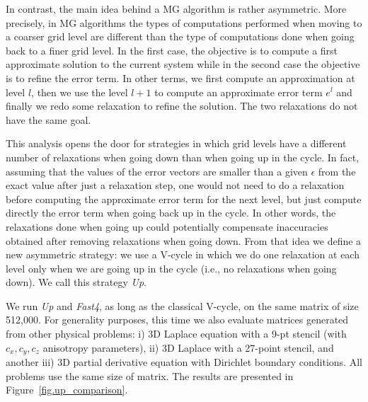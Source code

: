 In contrast, the main idea behind a MG algorithm is rather asymmetric. More
precisely, in MG algorithms the types of computations performed when moving to
a coarser grid level are different than the type of computations done when
going back to a finer grid level. In the first case, the objective is to
compute a first approximate solution to the current system while in the second
case the objective is to refine the error term. In other terms, we first
compute an approximation at level $l$, then we use the level $l+1$ to compute
an approximate error term $e^l$ and finally we redo some relaxation to refine
the solution. The two relaxations do not have the same goal.

This analysis opens the door for strategies in which grid levels have a
different number of relaxations when going down than when going up in the
cycle.  In fact, assuming that the values of the error vectors are smaller
than a given $\epsilon$ from the exact value after just a relaxation step, one
would not need to do a relaxation before computing the approximate error term
for the next level, but just compute directly the error term when going back up
in the cycle. In other words, the relaxations done when going up could
potentially compensate inaccuracies obtained after removing relaxations when
going down. From that idea we define a new asymmetric strategy: we use a
V-cycle in which we do one relaxation at each level only when we are going up
in the cycle (i.e., no relaxations when going down).  We call this strategy
\emph{Up}.

We run \emph{Up} and \emph{Fast4}, as long as the classical V-cycle, on the
same matrix of size 512,000. For generality purposes, this time we also
evaluate matrices generated from other physical problems: i) 3D Laplace equation with a 9-pt stencil (with $c_x,c_y,c_z$ anisotropy parameters), ii) 3D Laplace
with a 27-point stencil, and another iii) 3D partial derivative equation with
Dirichlet boundary conditions. All problems use the same size of matrix. The
results are presented in Figure~\ref{fig.up_comparison}.

